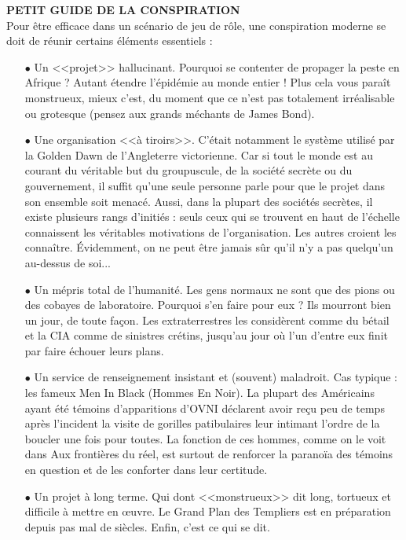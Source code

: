 \documentclass[11pt,twoside,a4paper]{article}
\begin{document}
\begin{multicols*}{2}
\textbf{\large PETIT GUIDE DE LA CONSPIRATION}~\\
Pour {\^e}tre efficace dans un sc{\'e}nario de jeu de r{\^o}le, une conspiration moderne se doit de r{\'e}unir certains {\'e}l{\'e}ments essentiels : 
\begin{itemize}
	\item[$\bullet$] Un <<projet>> hallucinant. Pourquoi se contenter de propager la peste en Afrique ? Autant {\'e}tendre l'{\'e}pid{\'e}mie au monde entier ! Plus cela vous para{\^i}t monstrueux, mieux c'est, du moment que ce n'est pas totalement irr{\'e}alisable ou grotesque (pensez aux grands m{\'e}chants de James Bond). 
	\item[$\bullet$] Une organisation <<{\`a} tiroirs>>. C'{\'e}tait notamment le syst{\`e}me utilis{\'e} par la Golden Dawn de l'Angleterre victorienne. Car si tout le monde est au courant du v{\'e}ritable but du groupuscule, de la soci{\'e}t{\'e} secr{\`e}te ou du gouvernement, il suffit qu'une seule personne parle pour que le projet dans son ensemble soit menac{\'e}. Aussi, dans la plupart des soci{\'e}t{\'e}s secr{\`e}tes, il existe plusieurs rangs d'initi{\'e}s : seuls ceux qui se trouvent en haut de l'{\'e}chelle connaissent les v{\'e}ritables motivations de l'organisation. Les autres croient les conna{\^i}tre. {\'E}videmment, on ne peut {\^e}tre jamais s{\^u}r qu'il n'y a pas quelqu'un au-dessus de soi...
	\item[$\bullet$] Un m{\'e}pris total de l'humanit{\'e}. Les gens normaux ne sont que des pions ou des cobayes de laboratoire. Pourquoi s'en faire pour eux ? Ils mourront bien un jour, de toute fa\c{c}on. Les extraterrestres les consid{\`e}rent comme du b{\'e}tail et la CIA comme de sinistres cr{\'e}tins, jusqu'au jour o{\`u} l'un d'entre eux finit par faire {\'e}chouer leurs plans. 
	\item[$\bullet$] Un service de renseignement insistant et (souvent) maladroit. Cas typique : les fameux Men In Black (Hommes En Noir). La plupart des Am{\'e}ricains ayant {\'e}t{\'e} t{\'e}moins d'apparitions d'OVNI d{\'e}clarent avoir re\c{c}u peu de temps apr{\`e}s l'incident la visite de gorilles patibulaires leur intimant l'ordre de la boucler une fois pour toutes. La fonction de ces hommes, comme on le voit dans Aux fronti{\`e}res du r{\'e}el, est surtout de renforcer la parano{\"i}a des t{\'e}moins en question et de les conforter dans leur certitude. 
	\item[$\bullet$] Un projet {\`a} long terme. Qui dont <<monstrueux>> dit long, tortueux et difficile {\`a} mettre en \oe uvre. Le Grand Plan des Templiers est en pr{\'e}paration depuis pas mal de si{\`e}cles. Enfin, c'est ce qui se dit. 

\end{itemize}
\end{multicols*}
\end{document}
